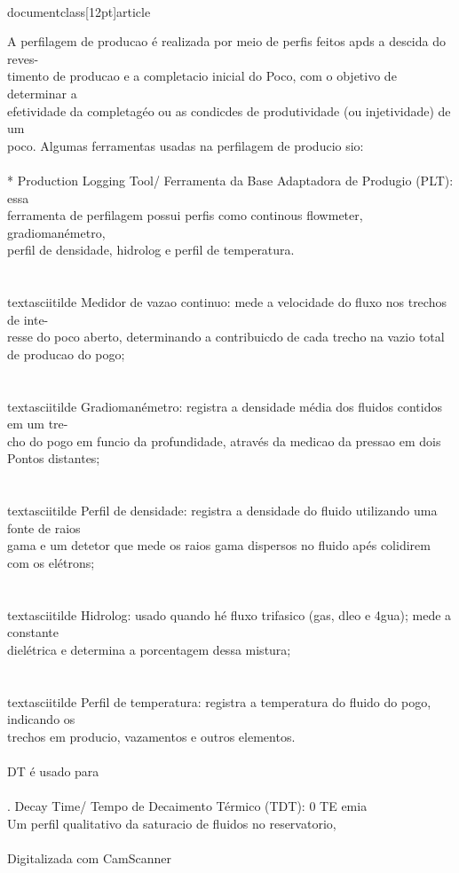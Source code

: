 \\documentclass[12pt]{article}
\begin{document}
A perfilagem de producao é realizada por meio de perfis feitos apds a descida do reves-\\
timento de producao e a completacio inicial do Poco, com o objetivo de determinar a\\
efetividade da completagéo ou as condicdes de produtividade (ou injetividade) de um\\
poco. Algumas ferramentas usadas na perfilagem de producio sio:\\
\\
* Production Logging Tool/ Ferramenta da Base Adaptadora de Produgio (PLT): essa\\
ferramenta de perfilagem possui perfis como continous flowmeter, gradiomanémetro,\\
perfil de densidade, hidrolog e perfil de temperatura.\\
\\
\\textasciitilde{} Medidor de vazao continuo: mede a velocidade do fluxo nos trechos de inte-\\
resse do poco aberto, determinando a contribuicdo de cada trecho na vazio total\\
de producao do pogo;\\
\\
\\textasciitilde{} Gradiomanémetro: registra a densidade média dos fluidos contidos em um tre-\\
cho do pogo em funcio da profundidade, através da medicao da pressao em dois\\
Pontos distantes;\\
\\
\\textasciitilde{} Perfil de densidade: registra a densidade do fluido utilizando uma fonte de raios\\
gama e um detetor que mede os raios gama dispersos no fluido apés colidirem\\
com os elétrons;\\
\\
\\textasciitilde{} Hidrolog: usado quando hé fluxo trifasico (gas, dleo e 4gua); mede a constante\\
dielétrica e determina a porcentagem dessa mistura;\\
\\
\\textasciitilde{} Perfil de temperatura: registra a temperatura do fluido do pogo, indicando os\\
trechos em producio, vazamentos e outros elementos.\\
\\
DT é usado para\\
\\
. Decay Time/ Tempo de Decaimento Térmico (TDT): 0 TE emia\\
Um perfil qualitativo da saturacio de fluidos no reservatorio,\\
\\
Digitalizada com CamScanner\\
\end{document}
